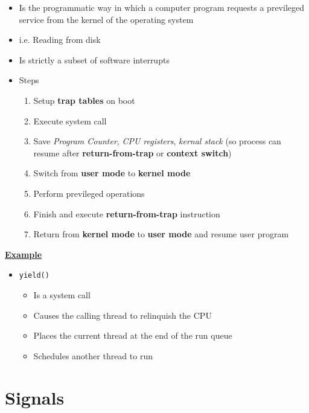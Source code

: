 \documentclass[12pt]{article}
\begin{document}
\begin{itemize}
    \item Is the programmatic way in which a computer program requests a previleged service from the kernel of the operating system
    \item i.e. Reading from disk
    \item Is strictly a subset of software interrupts
    \item Steps

    \begin{enumerate}[1)]
        \item Setup \textbf{trap tables} on boot
        \item Execute system call
        \item Save \textit{Program Counter}, \textit{CPU registers}, \textit{kernal stack} (so process can resume after \textbf{return-from-trap}
        or \textbf{context switch})
        \item Switch from \textbf{user mode} to \textbf{kernel mode}
        \item Perform previleged operations
        \item Finish and execute \textbf{return-from-trap} instruction
        \item Return from \textbf{kernel mode} to \textbf{user mode} and resume user program
    \end{enumerate}
\end{itemize}

\underline{\textbf{Example}}

\begin{itemize}
    \item \texttt{yield()}
    \begin{itemize}
        \item Is a system call
        \item Causes the calling thread to relinquish the CPU
        \item Places the current thread at the end of the run queue
        \item Schedules another thread to run
    \end{itemize}
\end{itemize}

\section{Signals}
\end{document}
